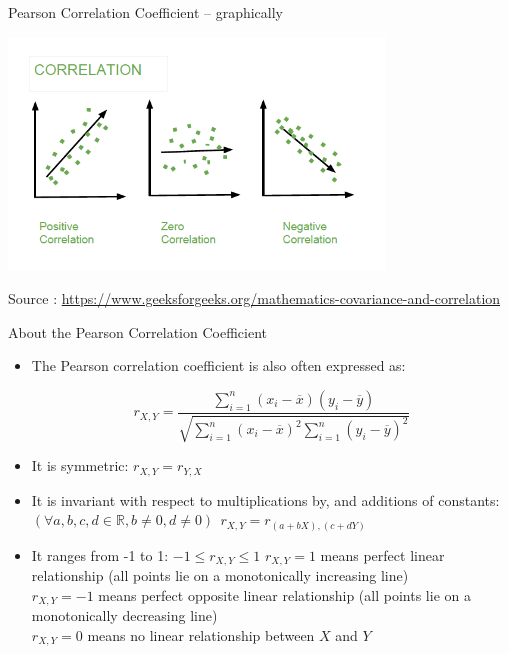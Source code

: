 \documentclass{beamer}
\begin{document}
\begin{frame}
{\centerline{Pearson Correlation Coefficient -- graphically}}


\begin{center}
\includegraphics[width=10cm]{P2023.AIBCCSS.FoundationsDataScience/Correl.png}
\end{center} 
\begin{center}
\tiny 
Source : \url{https://www.geeksforgeeks.org/mathematics-covariance-and-correlation}
\end{center}

\end{frame}


\begin{frame}
{\centerline{About the Pearson Correlation Coefficient}}

\begin{itemize}
\item The Pearson correlation coefficient is also often expressed as:

$$ r_{X,Y} = \frac{\sum_{i=1}^{n}(x_i-\overline{x})(y_i-\overline{y})}{\sqrt{\sum_{i=1}^{n}(x_i-\overline{x})^2\sum_{i=1}^{n}(y_i-\overline{y})^2}} $$
\item It is symmetric: $r_{X,Y} = r_{Y,X}$
\item It is invariant with respect to multiplications by, and additions of constants: $(\forall a, b, c, d \in \mathbb{R} , b \neq 0, d \neq 0)~~ r_{X,Y} = r_{(a + bX),(c + dY)} $
\item It ranges from -1 to 1: $-1 \leq r_{X,Y} \leq 1$
$ r_{X,Y}=1$ means perfect linear relationship (all points lie on a monotonically increasing line) \\
$ r_{X,Y}=-1$ means perfect opposite linear relationship (all points lie on a monotonically decreasing line)\\
$ r_{X,Y}= 0$ means no linear relationship between $X$ and $Y$
\end{itemize}


\end{frame}
\end{document}
